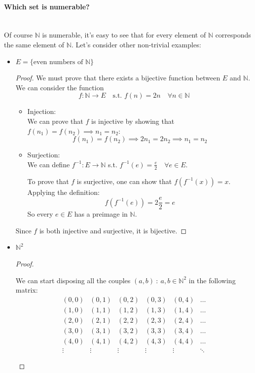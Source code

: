\paragraph{Which set is numerable?}\ \\
Of course $\mathbb N$ is numerable, it's easy to see that for every element of $\mathbb N$ corresponds the same element of $\mathbb N$. Let's consider other non-trivial examples:
\begin{itemize}
    \item $E=\{\text{even numbers of }\mathbb N\}$

    \begin{proof}
        We must prove that there exists a bijective function between $E$ and $\mathbb N$.
        We can consider the function
        $$f:\mathbb N\to E \quad\text{s.t. }f(n)=2n\quad \forall n\in \mathbb N$$
        \begin{itemize}
            \item Injection: \\
            We can prove that $f$ is injective by showing that $f(n_1)=f(n_2)\implies n_1=n_2$:
            $$f(n_1)=f(n_2)\implies 2n_1=2n_2\implies n_1=n_2$$
            \item Surjection:\\
            We can define $f^{-1}:E\to \mathbb N$ s.t. $f^{-1}(e)=\frac e2 \quad \forall e\in E$.

            To prove that $f$ is surjective, one can show that $f(f^{-1}(x))=x$. Applying the definition:
            $$f(f^{-1}(e))=2\frac e2 = e$$
            So every $e\in E$ has a preimage in $\mathbb N$.
        \end{itemize}
        Since $f$ is both injective and surjective, it is bijective.
    \end{proof}
    \item $\mathbb N^2$
    \begin{proof}
        \begin{itemize}
        We can start disposing all the couples $(a,b) \ : \ a,b\in \mathbb N^2$ in the following matrix:
        \begin{equation}
        \label{couples matrix}
        \begin{array}{cccccc}
        (0,0) & (0,1) & (0,2) & (0,3) & (0,4) & \dots \\
        (1,0) & (1,1) & (1,2) & (1,3) & (1,4) & \dots \\
        (2,0) & (2,1) & (2,2) & (2,3) & (2,4) & \dots \\
        (3,0) & (3,1) & (3,2) & (3,3) & (3,4) & \dots \\
        (4,0) & (4,1) & (4,2) & (4,3) & (4,4) & \dots \\
        \vdots & \vdots & \vdots & \vdots & \vdots & \ddots 
        \end{array}
        \end{equation}
        

\end{itemize}
\end{proof}
\end{itemize}
